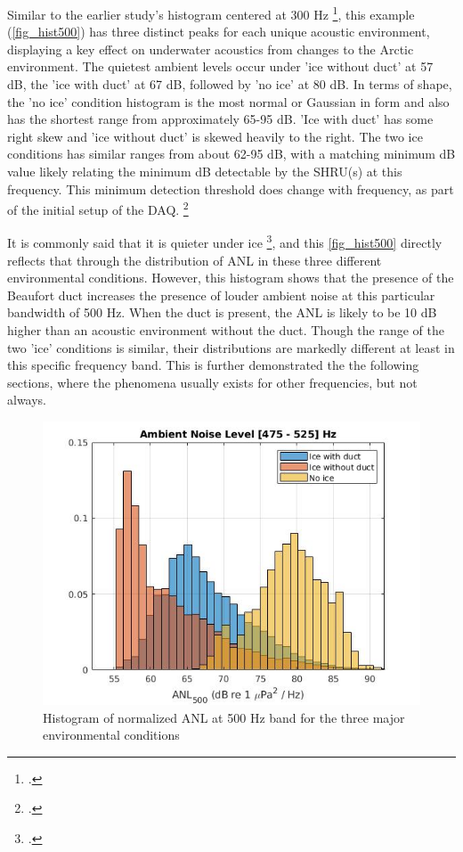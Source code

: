 Similar to the earlier study's histogram centered at 300 Hz \footcite[]{Bonnel2021}, this example (\autoref{fig_hist500}) has three distinct peaks for each unique acoustic environment, displaying a key effect on underwater acoustics from changes to the Arctic environment. The quietest ambient levels occur under 'ice without duct' at 57 dB, the 'ice with duct' at 67 dB, followed by 'no ice' at 80 dB. In terms of shape, the 'no ice' condition histogram is the most normal or Gaussian in form and also has the shortest range from approximately 65-95 dB. 'Ice with duct' has some right skew and 'ice without duct' is skewed heavily to the right. The two ice conditions has similar ranges from about 62-95 dB, with a matching minimum dB value likely relating the minimum dB detectable by the SHRU(s) at this frequency. This minimum detection threshold does change with frequency, as part of the initial setup of the DAQ. \footcite{DAQprocess} %

It is commonly said that it is quieter under ice \footcite[]{ice_environ2}, and this \autoref{fig_hist500} directly reflects that through the distribution of ANL in these three different environmental conditions. However, this histogram shows that the presence of the Beaufort duct increases the presence of louder ambient noise at this particular bandwidth of 500 Hz. When the duct is present, the ANL is likely to be 10 dB higher than an acoustic environment without the duct. Though the range of the two 'ice' conditions is similar, their distributions are markedly different at least in this specific frequency band. This is further demonstrated the the following sections, where the phenomena usually exists for other frequencies, but not always. %


\begin{figure}[p]
\centering
\includegraphics[scale=0.6]{Figures/ANL_500.jpg}
\caption{Histogram of normalized ANL at 500 Hz band for the three major environmental conditions}
\label{fig_hist500}
\end{figure}

